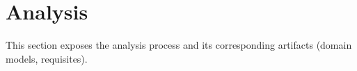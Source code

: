 
\section{Analysis}

This section exposes the analysis process and its corresponding artifacts (domain models, requisites).



